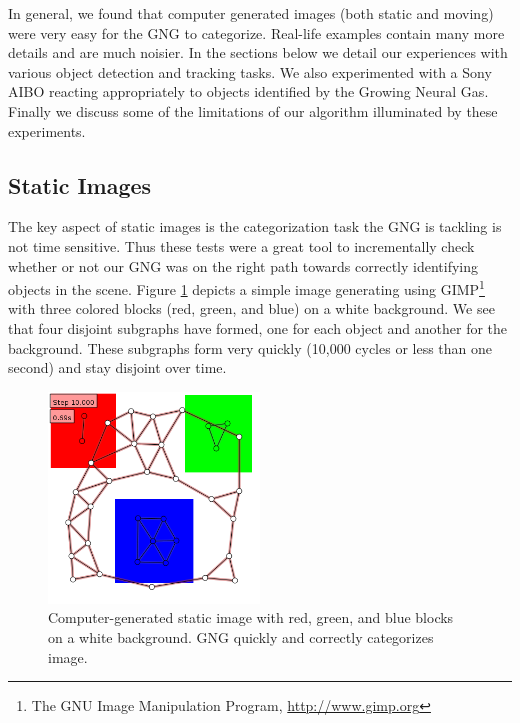 \documentclass{article}
\renewcommand{\|}{\origbar} %
\begin{document}
In general, we found that computer generated images (both static and moving) were very easy for the GNG to categorize. Real-life examples contain many more details and are much noisier. In the sections below we detail our experiences with various object detection and tracking tasks. We also experimented with a Sony AIBO reacting appropriately to objects identified by the Growing Neural Gas. Finally we discuss some of the limitations of our algorithm illuminated by these experiments.

\subsection{Static Images}


The key aspect of static images is the categorization task the GNG is tackling is not time sensitive. Thus these tests were a great tool to incrementally check whether or not our GNG was on the right path towards correctly identifying objects in the scene. Figure \ref{fig:rgbStatic} depicts a simple image generating using GIMP\footnote{The GNU Image Manipulation Program, \url{http://www.gimp.org}} with three colored blocks (red, green, and blue) on a white background. We see that four disjoint subgraphs have formed, one for each object and another for the background. These subgraphs form very quickly (10,000 cycles or less than one second) and stay disjoint over time. 

\begin{figure}[h!]
  \begin{center}
    \includegraphics[width=0.5\textwidth]{rgb_static.png}
  \end{center}
  \caption{Computer-generated static image with red, green, and blue blocks on a white background. GNG quickly and correctly categorizes image.}
  \label{fig:rgbStatic}
\end{figure}
\end{document}
